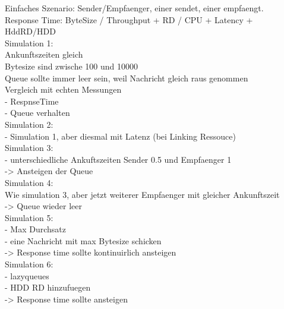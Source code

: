 Einfaches Szenario: Sender/Empfaenger, einer sendet, einer empfaengt.\\

Response Time: ByteSize / Throughput + RD / CPU + Latency + HddRD/HDD \\

Simulation 1: \\
Ankunftszeiten gleich \\
Bytesize sind zwische 100 und 10000 \\
Queue sollte immer leer sein, weil Nachricht gleich raus genommen \\
Vergleich mit echten Messungen \\
- RespnseTime \\
- Queue verhalten \\

Simulation 2: \\
- Simulation 1, aber diesmal mit Latenz (bei Linking Ressouce)\\

Simulation 3: \\
- unterschiedliche Ankuftszeiten Sender 0.5 und Empfaenger 1 \\
-> Ansteigen der Queue \\

Simulation 4: \\
Wie simulation 3, aber jetzt weiterer Empfaenger mit gleicher Ankunftszeit \\
-> Queue wieder leer\\

Simulation 5: \\
- Max Durchsatz \\
- eine Nachricht mit max Bytesize schicken \\
-> Response time sollte kontinuirlich ansteigen \\


Simulation 6: \\
- lazyqueues \\
- HDD RD hinzufuegen \\
-> Response time sollte ansteigen \\






